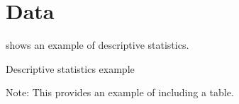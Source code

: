 \section{Data}
\label{s:data}
 shows an example of descriptive statistics.

\begin{table}
    \centering
    \caption{Descriptive statistics example}
    \label{t:descriptive}
    
    \caption*{Note: This provides an example of including a table.}
\end{table}

\begin{figure}
    \centering
\end{figure}
